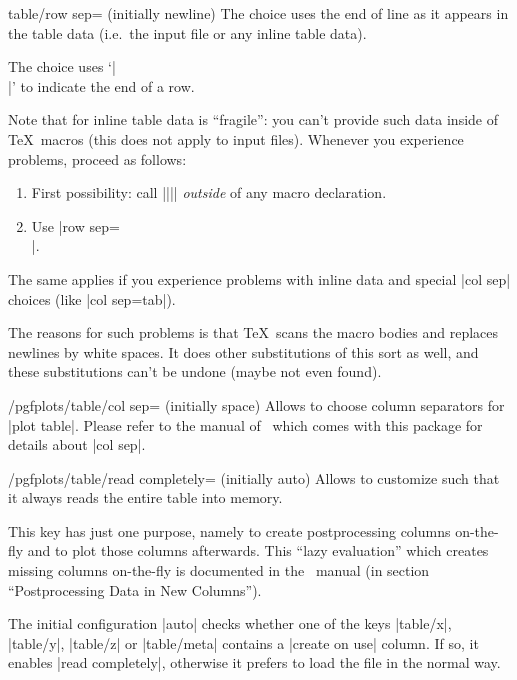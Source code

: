 {\begin{pgfplotskey}{table/row sep= (initially newline)}
	The choice  uses the end of line as it appears in the table data (i.e.\ the input file or any inline table data).

	The choice \declaretext{\string\\} uses `|\\|' to indicate the end of a row.

	Note that  for inline table data is ``fragile'': you can't provide such data inside of \TeX\ macros (this does not apply to input files). Whenever you experience problems, proceed as follows:
	\begin{enumerate}
		\item First possibility: call |\pgfplotstableread||\yourmacro| \emph{outside} of any macro declaration.
		\item Use |row sep=\\|.
	\end{enumerate}
	The same applies if you experience problems with inline data and special |col sep| choices (like |col sep=tab|).

	The reasons for such problems is that \TeX\ scans the macro bodies and replaces newlines by white spaces. It does other substitutions of this sort as well, and these substitutions can't be undone (maybe not even found).
\end{pgfplotskey}

\begin{key}{/pgfplots/table/col sep= (initially space)}
	Allows to choose column separators for |plot table|. Please refer to the manual of \PGFPlotstable\ which comes with this package for details about |col sep|.
\end{key}
\begin{key}{/pgfplots/table/read completely= (initially auto)}
	Allows to customize  such that it always reads the entire table into memory.

	This key has just one purpose, namely to create postprocessing columns on-the-fly and to plot those columns afterwards. This ``lazy evaluation'' which creates missing columns on-the-fly is documented in the \PGFPlotstable\ manual (in section ``Postprocessing Data in New Columns'').

	The initial configuration |auto| checks whether one of the keys |table/x|, |table/y|, |table/z| or |table/meta| contains a |create on use| column. If so, it enables |read completely|, otherwise it prefers to load the file in the normal way.


\end{key}}
